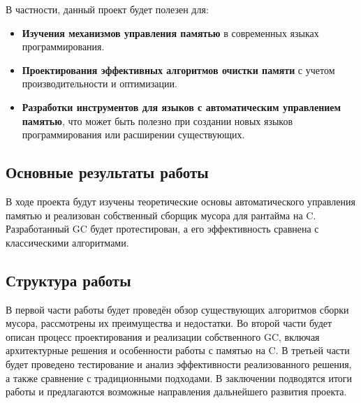 В частности, данный проект будет полезен для:
\begin{itemize}
    \item \textbf{Изучения механизмов управления памятью} в современных языках программирования.
    \item \textbf{Проектирования эффективных алгоритмов очистки памяти} с учетом производительности и оптимизации.
    \item \textbf{Разработки инструментов для языков с автоматическим управлением памятью}, что может быть полезно при создании новых языков программирования или расширении существующих.
\end{itemize}

\subsection{Основные результаты работы}

В ходе проекта будут изучены теоретические основы автоматического управления памятью и реализован собственный сборщик мусора для рантайма на C. Разработанный GC будет протестирован, а его эффективность сравнена с классическими алгоритмами.

\subsection{Структура работы}

В первой части работы будет проведён обзор существующих алгоритмов сборки мусора, рассмотрены их преимущества и недостатки. Во второй части будет описан процесс проектирования и реализации собственного GC, включая архитектурные решения и особенности работы с памятью на C. В третьей части будет проведено тестирование и анализ эффективности реализованного решения, а также сравнение с традиционными подходами. В заключении подводятся итоги работы и предлагаются возможные направления дальнейшего развития проекта.

